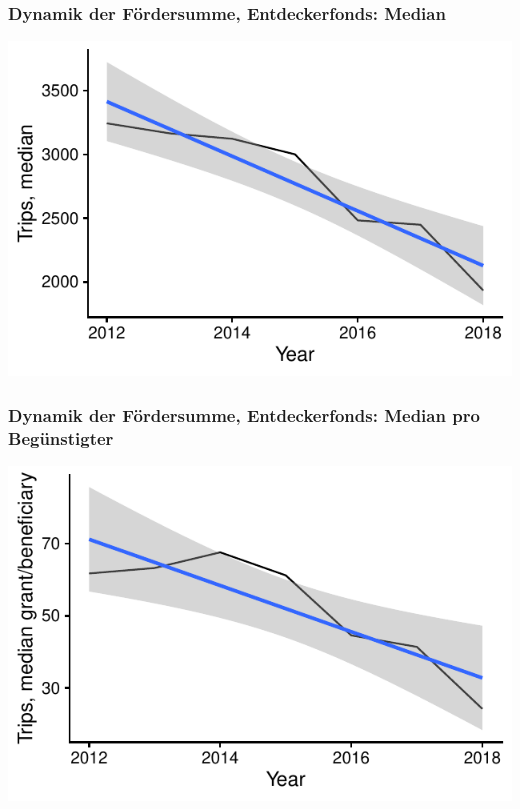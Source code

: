 \begin{frame}[fragile]
\frametitle{Dynamik der Fördersumme, Entdeckerfonds: Median}



{\centering \includegraphics[width=\maxwidth]{figure/beamer-FundamentalDynamicsTripsMedian-1} 

}



\end{frame}

\begin{frame}[fragile]
\frametitle{Dynamik der Fördersumme, Entdeckerfonds: Median pro Begünstigter}


{\centering \includegraphics[width=\maxwidth]{figure/beamer-FundamentalDynamicsTripsMedianPerBene-1} 

}



\end{frame}

